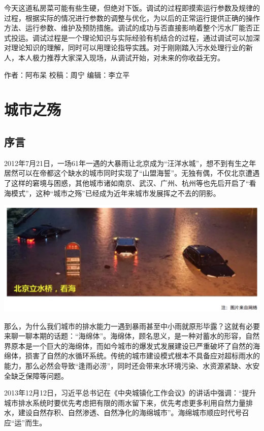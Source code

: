 \documentclass[]{book}
\begin{document}
今天这道私房菜可能有些生硬，但绝对下饭。调试的过程即摸索运行参数及规律的过程，根据实际的情况进行参数的调整与优化，为以后的正常运行提供正确的操作方法、运行参数、维护及预防措施。调试的成功与否直接影响着整个污水厂能否正式投运。调试过程是一个理论知识与实际经验有机结合的过程，通过调试可以加深对理论知识的理解，同时可以用理论指导实践。对于刚刚踏入污水处理行业的新人，本人极力推荐大家深入现场，从调试开始，对未来的你收益无穷。

作者：阿布呆 校稿：周宁 编辑：李立平

\section{城市之殇}

\subsection{序言}

2012年7月21日，一场61年一遇的大暴雨让北京成为``汪洋水城''，想不到有生之年居然可以在帝都这个缺水的城市同时实现了``山盟海誓''。无独有偶，不仅北京遭遇了这样的窘境与困惑，其他城市诸如南京、武汉、广州、杭州等也先后开启了``看海模式''，这种``城市之殇''已经成为近年来城市发展挥之不去的阴影。

\includegraphics[width=6.67in]{images/ch1}

那么，为什么我们城市的排水能力一遇到暴雨甚至中小雨就原形毕露？这就有必要来聊一聊本期的话题：``海绵体''。海绵体，顾名思义，是一种对蓄水的形容，自然界原本是一个巨大的海绵体，而如今城市的爆发式发展建设已严重破坏了自然的海绵体，损害了自然的水循环系统。传统的城市建设模式根本不具备应对超标雨水的能力，那么必然会导致``逢雨必涝''，同时还会带来水环境污染、水资源紧缺、水安全缺乏保障等问题。

2013年12月12日，习近平总书记在《中央城镇化工作会议》的讲话中强调：``提升城市排水系统时要优先考虑把有限的雨水留下来，优先考虑更多利用自然力量排水，建设自然存积、自然渗透、自然净化的海绵城市''。海绵城市顺应时代号召应``运''而生。
\end{document}
